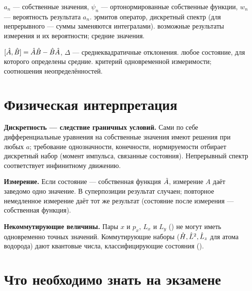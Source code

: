  {$a_n$ — собственные значения, $\psi_n$ — ортонормированные собственные функции, $w_n$ — вероятность результата $a_n$.}
 {эрмитов оператор, дискретный спектр (для непрерывного — суммы заменяются интегралами).}
 {возможные результаты измерения и их вероятности; средние значения.}

 {$[\hat{A},\hat{B}]=\hat{A}\hat{B}-\hat{B}\hat{A}$, $\Delta$ — среднеквадратичные отклонения.}
 {любое состояние, для которого определены средние.}
 {критерий одновременной измеримости; соотношения неопределённостей.}

\section{Физическая интерпретация}

\textbf{Дискретность — следствие граничных условий.} Сами по себе дифференциальные уравнения на
собственные значения имеют решения при любых $a$; требование однозначности, конечности,
нормируемости отбирает дискретный набор (момент импульса, связанные состояния). Непрерывный
спектр соответствует инфинитному движению.

\textbf{Измерение.} Если состояние — собственная функция $\hat{A}$, измерение $A$ даёт заведомо
одно значение. В суперпозиции результат случаен; повторное немедленное измерение даёт тот же
результат (состояние после измерения — собственная функция).

\textbf{Некоммутирующие величины.} Пары $x$ и $p_x$, $L_x$ и $L_y$ () не могут иметь
одновременно точных значений. Коммутирующие наборы ($\hat{H},\hat{L}^2,\hat{L}_z$ для атома водорода)
дают квантовые числа, классифицирующие состояния ().

\section{Что необходимо знать на экзамене}

